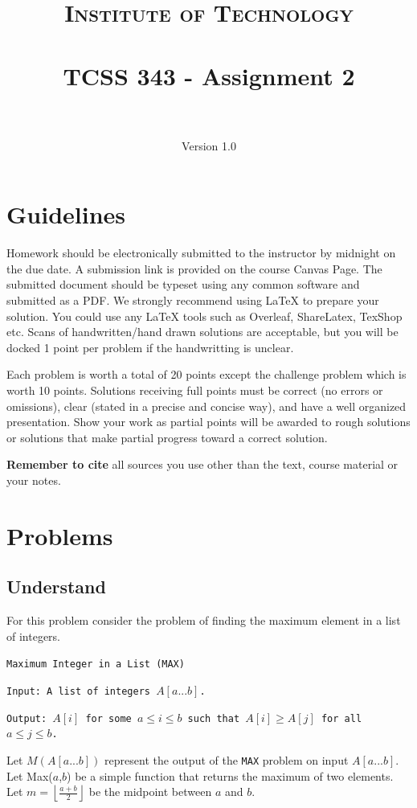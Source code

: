 \documentclass[paper=a4, fontsize=11pt]{scrartcl}
\title{
		\usefont{OT1}{bch}{b}{n}
		\normalfont \normalsize \textsc{Institute of Technology} \\ [25pt]
		\horrule{0.5pt} \\[0.4cm]
		\huge TCSS 343 - Assignment 2\\
		\horrule{2pt} \\[0.5cm]
}
\author{
		\normalfont 								\normalsize
        Version 1.0\\[-3pt]
}
\numberwithin{equation}{section}		%
\numberwithin{figure}{section}			%
\numberwithin{table}{section}				%
\begin{document}
\maketitle

\section{Guidelines}
Homework should be electronically submitted to the instructor by midnight on the due date.  A submission link is provided on the course Canvas Page.  The submitted document should be typeset using any common software and submitted as a PDF.  We strongly recommend using \LaTeX\;  to prepare your solution.  You could use any \LaTeX\; tools such as Overleaf, ShareLatex, TexShop etc. Scans of handwritten/hand drawn solutions are acceptable, but you will be docked 1 point per problem if the handwritting is unclear.

Each problem is worth a total of 20 points except the challenge problem which is worth 10 points.  Solutions receiving full points must be correct (no errors or omissions), clear (stated in a precise and concise way), and have a well organized presentation.  Show your work as partial points will be awarded to rough solutions or solutions that make partial progress toward a correct solution.

\textbf{Remember to cite} all sources you use other than the text, course material or your notes.

\newpage
\section{Problems}

\subsection{Understand}

For this problem consider the problem of finding the maximum element in a list of integers.

\vspace{12pt}

\noindent\texttt{Maximum Integer in a List (MAX)}

\texttt{Input: A list of integers $A[a...b]$.}

\texttt{Output: $A[i]$ for some $a\leq i\leq b$ such that $A[i] \geq A[j]$ for all $a \leq j \leq b$.}
\vspace{12pt}

\noindent Let $M(A[a...b])$ represent the output of the \texttt{MAX} problem on input $A[a...b]$.  Let Max($a$,$b$) be a simple function that returns the maximum of two elements.  Let $m = \left\lfloor\frac{a+b}{2}\right\rfloor$ be the midpoint between $a$ and $b$.
\end{document}
